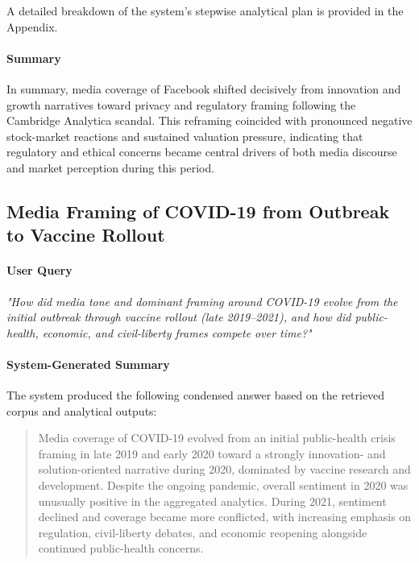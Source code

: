 A detailed breakdown of the system's stepwise analytical plan is provided in the Appendix.

\paragraph{Summary}

In summary, media coverage of Facebook shifted decisively from innovation and growth narratives toward privacy and regulatory framing following the Cambridge Analytica scandal. This reframing coincided with pronounced negative stock-market reactions and sustained valuation pressure, indicating that regulatory and ethical concerns became central drivers of both media discourse and market perception during this period.


\subsection{Media Framing of COVID-19 from Outbreak to Vaccine Rollout}

\paragraph{User Query}

\textit{"How did media tone and dominant framing around COVID-19 evolve from the initial outbreak through vaccine rollout (late 2019–2021), and how did public-health, economic, and civil-liberty frames compete over time?"}

\paragraph{System-Generated Summary}
The system produced the following condensed answer based on the retrieved corpus and analytical outputs:

\begin{quote}
Media coverage of COVID-19 evolved from an initial public-health crisis framing in late 2019 and early 2020 toward a strongly innovation- and solution-oriented narrative during 2020, dominated by vaccine research and development. Despite the ongoing pandemic, overall sentiment in 2020 was unusually positive in the aggregated analytics. During 2021, sentiment declined and coverage became more conflicted, with increasing emphasis on regulation, civil-liberty debates, and economic reopening alongside continued public-health concerns.
\end{quote}

